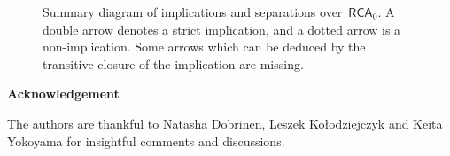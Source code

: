 \documentclass{article}
\newcommand{\RCA}[0]{\mathsf{RCA}}
\numberwithin{theorem}{section}
\theoremstyle{definition}
\begin{document}
\begin{figure}[htbp]
\begin{center}

\caption{\label{fig:summary} Summary diagram of implications and separations over~$\RCA_0$. A double arrow denotes a strict implication, and a dotted arrow is a non-implication. Some arrows which can be deduced by the transitive closure of the implication are missing.}
\end{center}

\end{figure}

\begin{center}
\textbf{Acknowledgement}
\end{center}

The authors are thankful to Natasha Dobrinen, Leszek Ko\l odziejczyk and Keita Yokoyama for insightful comments and discussions.



\end{document}
